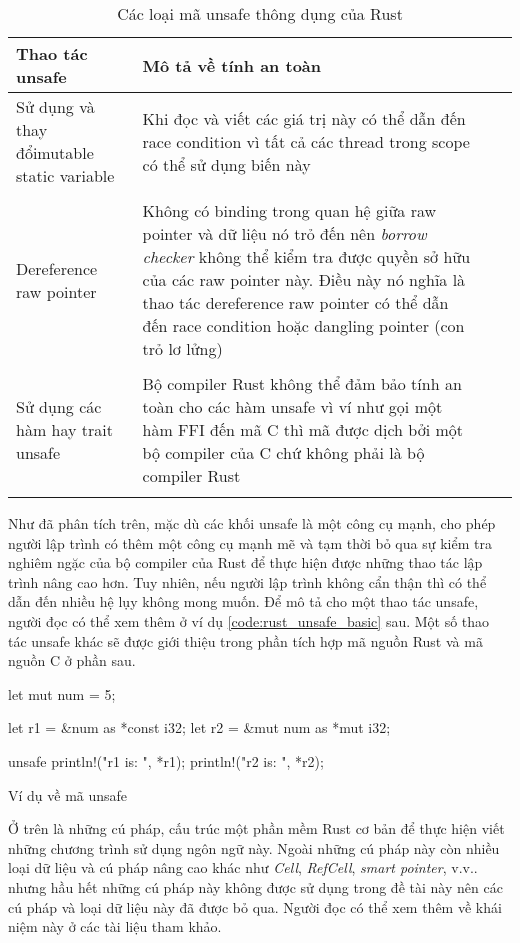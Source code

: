 \begin{longtable}{>{\raggedleft\arraybackslash}p{6cm}|p{7cm}  >{\raggedleft\arraybackslash}p{5cm}|p{7cm}}
\textbf{Thao tác unsafe} & \textbf{Mô tả về tính an toàn} \\
\midrule
\endhead
Sử dụng và thay đổi\linebreak mutable static variable & Khi đọc và viết các giá trị này có thể dẫn đến race condition vì tất cả các thread trong scope có thể sử dụng biến này \\
\\
Dereference raw pointer & Không có binding trong quan hệ giữa raw pointer và dữ liệu nó trỏ đến nên \emph{borrow checker} không thể kiểm tra được quyền sở hữu của các raw pointer này. Điều này nó nghĩa là thao tác dereference raw pointer có thể dẫn đến race condition hoặc dangling pointer (con trỏ lơ lửng)\\
\\
Sử dụng các hàm hay trait unsafe & Bộ compiler Rust không thể đảm bảo tính an toàn cho các hàm unsafe vì ví như gọi một hàm FFI đến mã C thì mã được dịch bởi một bộ compiler của C chứ không phải là bộ compiler Rust\\
\bottomrule
\caption{Các loại mã unsafe thông dụng của Rust}
\label{tbl:rust_unsafe}
\end{longtable}
Như đã phân tích trên, mặc dù các khối unsafe là một công cụ mạnh, cho phép người lập trình có thêm một công cụ mạnh mẽ và tạm thời bỏ qua sự kiểm tra nghiêm ngặc của bộ compiler của Rust để thực hiện được những thao tác lập trình nâng cao hơn.
Tuy nhiên, nếu người lập trình không cẩn thận thì có thể dẫn đến nhiều hệ lụy không mong muốn.
Để mô tả cho một thao tác unsafe, người đọc có thể xem thêm ở ví dụ \ref{code:rust_unsafe_basic} sau.
Một số thao tác unsafe khác sẽ được giới thiệu trong phần tích hợp mã nguồn Rust và mã nguồn C ở phần sau.

\begin{listing}[H]
\begin{rustcode}
let mut num = 5;

let r1 = &num as *const i32;
let r2 = &mut num as *mut i32;

unsafe {
    println!("r1 is: {}", *r1);
    println!("r2 is: {}", *r2);
}
\end{rustcode}
\caption{Ví dụ về mã unsafe}
\label{code:rust_unsafe_basic}
\end{listing}

Ở trên là những cú pháp, cấu trúc một phần mềm Rust cơ bản để thực hiện viết những chương trình sử dụng ngôn ngữ này.
Ngoài những cú pháp này còn nhiều loại dữ liệu và cú pháp nâng cao khác như \emph{Cell}, \emph{RefCell}, \emph{smart pointer}, v.v.. nhưng hầu hết những cú pháp này không được sử dụng trong đề tài này nên các cú pháp và loại dữ liệu này đã được bỏ qua.
Người đọc có thể xem thêm về khái niệm này ở các tài liệu tham khảo.

